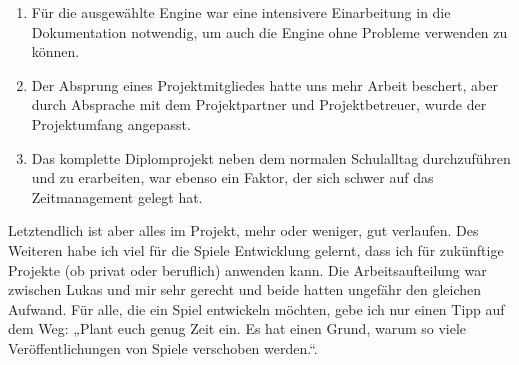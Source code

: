 \begin{enumerate}
	\item Für die ausgewählte Engine war eine intensivere Einarbeitung in die Dokumentation notwendig, um auch die Engine ohne Probleme verwenden zu können.
	\item Der Absprung eines Projektmitgliedes hatte uns mehr Arbeit beschert, aber durch Absprache mit dem Projektpartner und Projektbetreuer, wurde der Projektumfang angepasst.
	\item Das komplette Diplomprojekt neben dem normalen Schulalltag durchzuführen und zu erarbeiten, war ebenso ein Faktor, der sich schwer auf das Zeitmanagement gelegt hat.
\end{enumerate}
	
Letztendlich ist aber alles im Projekt, mehr oder weniger, gut verlaufen. Des Weiteren habe ich viel für die Spiele Entwicklung gelernt, dass ich für zukünftige Projekte (ob privat oder beruflich) anwenden kann. Die Arbeitsaufteilung war zwischen Lukas und mir sehr gerecht und beide hatten ungefähr den gleichen Aufwand. Für alle, die ein Spiel entwickeln möchten, gebe ich nur einen Tipp auf dem Weg: „Plant euch genug Zeit ein. Es hat einen Grund, warum so viele Veröffentlichungen von Spiele verschoben werden.“.

